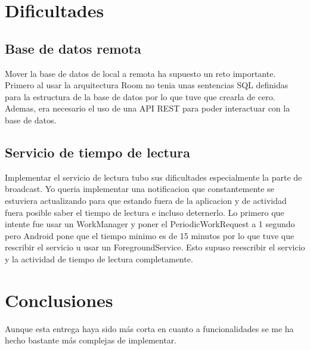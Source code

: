 \documentclass[a4paper,12pt]{report}
\begin{document}
  \chapter{Dificultades}
    \section{Base de datos remota}
      Mover la base de datos de local a remota ha supuesto un reto importante.
      Primero al usar la arquitectura Room no tenia unas sentencias SQL definidas para la estructura de la base de datos por lo que tuve que crearla de cero.
      Ademas, era necesario el uso de una API REST para poder interactuar con la base de datos.
    \section{Servicio de tiempo de lectura}
      Implementar el servicio de lectura tubo sus dificultades especialmente la parte de broadcast.
      Yo queria implementar una notificacion que constantemente se estuviera actualizando para que estando fuera de la aplicacion y de actividad fuera posible saber el tiempo de lectura e incluso deternerlo.
      Lo primero que intente fue usar un WorkManager y poner el PeriodicWorkRequest a 1 segundo pero Android pone que el tiempo minimo es de 15 minutos por lo que tuve que rescribir el servicio u usar un ForegroundService.
      Esto supuso reescribir el servicio y la actividad de tiempo de lectura completamente.
  \chapter{Conclusiones}
    Aunque esta entrega haya sido más corta en cuanto a funcionalidades se me ha hecho bastante más complejas de implementar.
  \printbibliography[title=Bibliografía]
\end{document}
